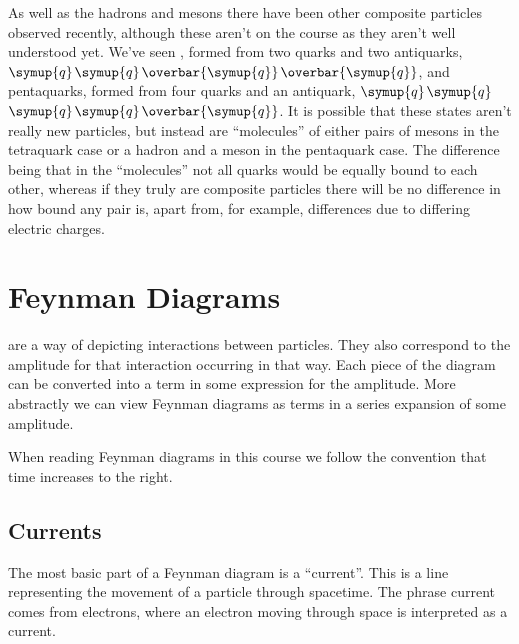 \documentclass[fleqn]{NotesClass}
\newcommand{\Pparticle}[1]{\symup{#1}}
\newcommand{\Pq}{\ensuremath{\Pparticle{q}}}
\newcommand{\APantiparticle}[1]{\overbar{#1}}
\newcommand{\APq}{\ensuremath{\APantiparticle{\Pparticle{q}}}}
\begin{document}
    As well as the hadrons and mesons there have been other composite particles observed recently, although these aren't on the course as they aren't well understood yet.
    We've seen , formed from two quarks and two antiquarks, \Pq\Pq\APq\APq, and pentaquarks, formed from four quarks and an antiquark, \Pq\Pq\Pq\Pq\APq.
    It is possible that these states aren't really new particles, but instead are \enquote{molecules} of either pairs of mesons in the tetraquark case or a hadron and a meson in the pentaquark case.
    The difference being that in the \enquote{molecules} not all quarks would be equally bound to each other, whereas if they truly are composite particles there will be no difference in how bound any pair is, apart from, for example, differences due to differing electric charges.
    
    \chapter{Feynman Diagrams}
     are a way of depicting interactions between particles.
    They also correspond to the amplitude for that interaction occurring in that way.
    Each piece of the diagram can be converted into a term in some expression for the amplitude.
    More abstractly we can view Feynman diagrams as terms in a series expansion of some amplitude.
    
    When reading Feynman diagrams in this course we follow the convention that time increases to the right.
    
    \section{Currents}
    The most basic part of a Feynman diagram is a \enquote{current}.
    This is a line representing the movement of a particle through spacetime.
    The phrase current comes from electrons, where an electron moving through space is interpreted as a current.
    
\end{document}
